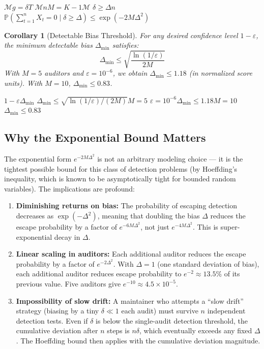 \documentclass[12pt,a4paper]{article}
\newtheorem{corollary}[theorem]{Corollary}
\theoremstyle{remark}
\newcommand{\Pbb}{\mathbb{P}}
\begin{document}
\noindent\textbf{}
$\mathcal{M}$$g = \delta$$T$
$\mathcal{M}$$n$$M = K-1$$\mathcal{M}$
$\delta \geq \Delta$$n$
$\Pbb(\sum_{t=1}^{n} X_t = 0 \mid \delta \geq \Delta) \leq \exp(-2M\Delta^2)$

\begin{corollary}[Detectable Bias Threshold]\label{cor:threshold}
For any desired confidence level $1 - \varepsilon$, the minimum detectable bias
$\Delta_{\min}$ satisfies:
\begin{equation}
    \Delta_{\min} \leq \sqrt{\frac{\ln(1/\varepsilon)}{2M}}
\end{equation}
With $M = 5$ auditors and $\varepsilon = 10^{-6}$, we obtain
$\Delta_{\min} \leq 1.18$ (in normalized score units). With $M = 10$,
$\Delta_{\min} \leq 0.83$.
\end{corollary}

\noindent\textbf{}
$1 - \varepsilon$$\Delta_{\min}$
$\Delta_{\min} \leq \sqrt{\ln(1/\varepsilon) / (2M)}$$M = 5$
$\varepsilon = 10^{-6}$$\Delta_{\min} \leq 1.18$$M = 10$
$\Delta_{\min} \leq 0.83$

\subsection{Why the Exponential Bound Matters}

The exponential form $e^{-2M\Delta^2}$ is not an arbitrary modeling choice — it
is the tightest possible bound for this class of detection problems (by
Hoeffding's inequality, which is known to be asymptotically tight for bounded
random variables). The implications are profound:

\begin{enumerate}[label=(\arabic*), leftmargin=*]
    \item \textbf{Diminishing returns on bias:} The probability of escaping
          detection decreases as $\exp(-\Delta^2)$, meaning that doubling the
          bias $\Delta$ reduces the escape probability by a factor of
          $e^{-6M\Delta^2}$, not just $e^{-4M\Delta^2}$. This is super-exponential
          decay in $\Delta$.
    \item \textbf{Linear scaling in auditors:} Each additional auditor reduces
          the escape probability by a factor of $e^{-2\Delta^2}$. With
          $\Delta = 1$ (one standard deviation of bias), each additional auditor
          reduces escape probability to $e^{-2} \approx 13.5\%$ of its previous
          value. Five auditors give $e^{-10} \approx 4.5 \times 10^{-5}$.
    \item \textbf{Impossibility of slow drift:} A maintainer who attempts a
          ``slow drift'' strategy (biasing by a tiny $\delta \ll 1$ each audit)
          must survive $n$ independent detection tests. Even if $\delta$ is
          below the single-audit detection threshold, the cumulative deviation
          after $n$ steps is $n\delta$, which eventually exceeds any fixed
          $\Delta$. The Hoeffding bound then applies with the cumulative
          deviation magnitude.
\end{enumerate}
\end{document}
